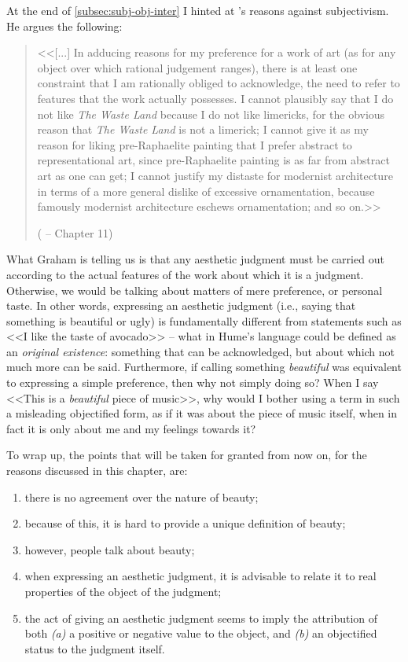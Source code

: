 At the end of \autoref{subsec:subj-obj-inter} I hinted at \citeauthor{graham2005philosophy}'s reasons against subjectivism. He argues the following:
\begin{quote}
<<[...] In adducing reasons for my preference for a work of art (as for any object over which rational judgement ranges), there is at least one constraint that I am rationally obliged to acknowledge, the need to refer to features that the work actually possesses. I cannot plausibly say that I do not like \emph{The Waste Land} because I do not like limericks, for the obvious reason that \emph{The Waste Land} is not a limerick; I cannot give it as my reason for liking pre-Raphaelite painting that I prefer abstract to representational art, since pre-Raphaelite painting is as far from abstract art as one can get; I cannot justify my distaste for modernist architecture in terms of a more general dislike of excessive ornamentation, because famously modernist architecture eschews ornamentation; and so on.>>

(\cite{graham2005philosophy} -- Chapter 11)
\end{quote}

What Graham is telling us is that any aesthetic judgment must be carried out according to the actual features of the work about which it is a judgment. Otherwise, we would be talking about matters of mere preference, or personal taste. In other words, expressing an aesthetic judgment (i.e., saying that something is beautiful or ugly) is fundamentally different from statements such as <<I like the taste of avocado>> -- what in Hume's language could be defined as an \emph{original existence}: something that can be acknowledged, but about which not much more can be said. Furthermore, if calling something \emph{beautiful} was equivalent to expressing a simple preference, then why not simply doing so? When I say <<This is a \emph{beautiful} piece of music>>, why would I bother using a term in such a misleading objectified form, as if it was about the piece of music itself, when in fact it is only about me and my feelings towards it?

To wrap up, the points that will be taken for granted from now on, for the reasons discussed in this chapter, are:
\begin{enumerate}
	\item there is no agreement over the nature of beauty;
	\item because of this, it is hard to provide a unique definition of beauty;
	\item however, people talk about beauty;
	\item when expressing an aesthetic judgment, it is advisable to relate it to real properties of the object of the judgment;
	\item the act of giving an aesthetic judgment seems to imply the attribution of both \emph{(a)} a positive or negative value to the object, and \emph{(b)} an objectified status to the judgment itself.
\end{enumerate}

